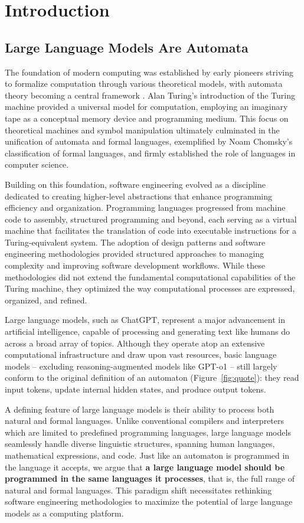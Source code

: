 \section{Introduction}

\subsection{Large Language Models Are Automata}

The foundation of modern computing was established by early pioneers striving to formalize computation through various theoretical models, with automata theory becoming a central framework \cite{hopcroft1979}. Alan Turing’s introduction of the Turing machine\cite{turing1936} provided a universal model for computation, employing an imaginary tape as a conceptual memory device and programming medium. This focus on theoretical machines and symbol manipulation ultimately culminated in the unification of automata and formal languages, exemplified by Noam Chomsky’s classification of formal languages\cite{chomsky1956}, and firmly established the role of languages in computer science.

Building on this foundation, software engineering evolved as a discipline dedicated to creating higher-level abstractions that enhance programming efficiency and organization. Programming languages progressed from machine code to assembly, structured programming and beyond, each serving as a virtual machine that facilitates the translation of code into executable instructions for a Turing-equivalent system.  The adoption of design patterns and software engineering methodologies provided structured approaches to managing complexity and improving software development workflows. While these methodologies did not extend the fundamental computational capabilities of the Turing machine, they optimized the way computational processes are expressed, organized, and refined.

Large language models, such as ChatGPT, represent a major advancement in artificial intelligence, capable of processing and generating text like humans do across a broad array of topics. Although they operate atop an extensive computational infrastructure and draw upon vast resources, basic language models -- excluding reasoning-augmented models like GPT-o1 -- still largely conform to the original definition of an automaton (Figure~\ref{fig:quote}): they read input tokens, update internal hidden states, and produce output tokens.

A defining feature of large language models is their ability to process both natural and formal languages. Unlike conventional compilers and interpreters which are limited to predefined programming languages, large language models seamlessly handle diverse linguistic structures, spanning human languages, mathematical expressions, and code. Just like an automaton is programmed in the language it accepts, we argue that {\bf a large language model should be programmed in the same languages it processes}, that is, the full range of natural and formal languages. This paradigm shift necessitates rethinking software engineering methodologies to maximize the potential of large language models as a computing platform.

